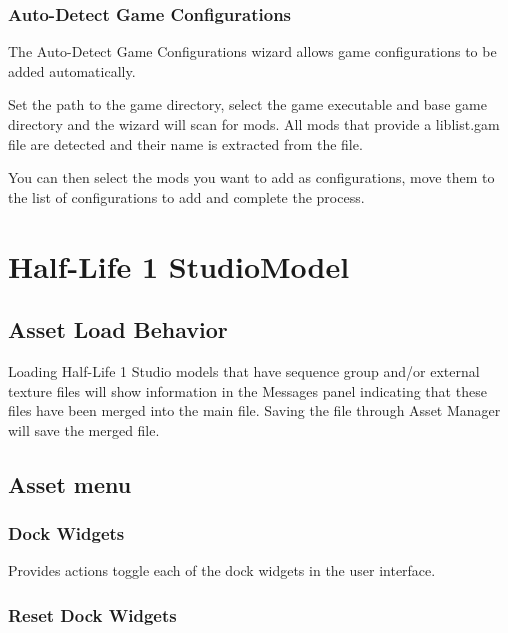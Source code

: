 \documentclass[10pt, a4paper, titlepage, oneside]{article}
\begin{document}
\subsubsection{Auto-Detect Game Configurations}

The Auto-Detect Game Configurations wizard allows game configurations to be added automatically.

\vspace{\baselineskip}
Set the path to the game directory, select the game executable and base game directory and the wizard will scan for mods. All mods that provide a liblist.gam file are detected and their name is extracted from the file.

\vspace{\baselineskip}
You can then select the mods you want to add as configurations, move them to the list of configurations to add and complete the process.

\newpage

\section{Half-Life 1 StudioModel}
\label{sec:hl1studiomodel}

\subsection{Asset Load Behavior}

Loading Half-Life 1 Studio models that have sequence group and/or external texture files will show information in the Messages panel indicating that these files have been merged into the main file. Saving the file through Asset Manager will save the merged file.

\subsection{Asset menu}

\subsubsection{Dock Widgets}

Provides actions toggle each of the dock widgets in the user interface.

\subsubsection{Reset Dock Widgets}
\end{document}
